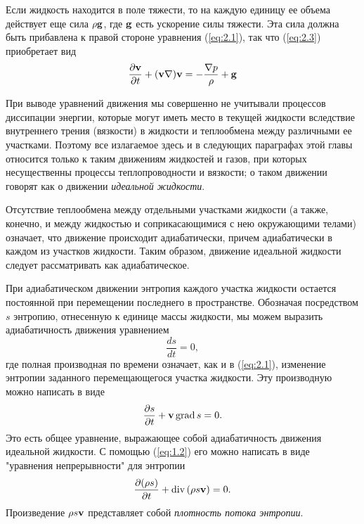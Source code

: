 Если жидкость находится в поле тяжести, то на каждую единицу ее объема действует
еще сила $\rho \mathbf{g}$, где $\mathbf{g}$ есть ускорение силы тяжести. Эта сила
должна быть прибавлена к правой стороне уравнения (\ref{eq:2.1}), так что (\ref{eq:2.3})
приобретает вид
\begin{equation}
   \label{eq:2.4}
   \frac{\partial{ \mathbf{v} }}{\partial t}+({\mathbf{v}} \nabla) {\mathbf{v}} = - \frac{\nabla p}{\rho} + \mathbf{g}
\end{equation}

При выводе уравнений движения мы совершенно не учитывали процессов диссипации
энергии, которые могут иметь место в текущей жидкости вследствие внутреннего
трения (вязкости) в жидкости и теплообмена между различными ее участками.
Поэтому все излагаемое здесь и в следующих параграфах этой главы относится
только к таким движениям жидкостей и газов, при которых несущественны процессы
теплопроводности и вязкости; о таком движении говорят как о движении
\textit{идеальной жидкости}.

Отсутствие теплообмена между отдельными участками жидкости (а также, конечно, и
между жидкостью и соприкасающимися с нею окружающими телами) означает, что
движение происходит адиабатически, причем адиабатически в каждом из участков
жидкости. Таким образом, движение идеальной жидкости следует рассматривать как
адиабатическое.

При адиабатическом движении энтропия каждого участка жидкости остается
постоянной при перемещении последнего в пространстве. Обозначая посредством $s$
энтропию, отнесенную к единице массы жидкости, мы можем выразить адиабатичность
движения уравнением
\begin{equation}
   \label{eq:2.5}
   \frac{ds}{dt} = 0,
\end{equation}
где полная производная по времени означает, как и в (\ref{eq:2.1}),
изменение энтропии заданного перемещающегося участка жидкости. Эту производную
можно написать в виде
\begin{equation}
   \label{eq:2.6}
   \frac{\partial s}{\partial t} + {\mathbf{v}} \mathop{\mathrm{grad}}\nolimits s= 0.
\end{equation}
Это есть общее уравнение, выражающее собой адиабатичность движения идеальной
жидкости. С помощью (\ref{eq:1.2}) его можно написать в виде "уравнения непрерывности"
для энтропии
\begin{equation}
   \label{eq:2.7}
   \frac{\partial{(\rho s)}}{\partial t} + \mathop{\mathrm{div}}\nolimits{(\rho s { \mathbf{v} })} = 0.
\end{equation}
Произведение $\rho s {\mathbf{v}}$ представляет собой \textit{плотность потока энтропии}.

